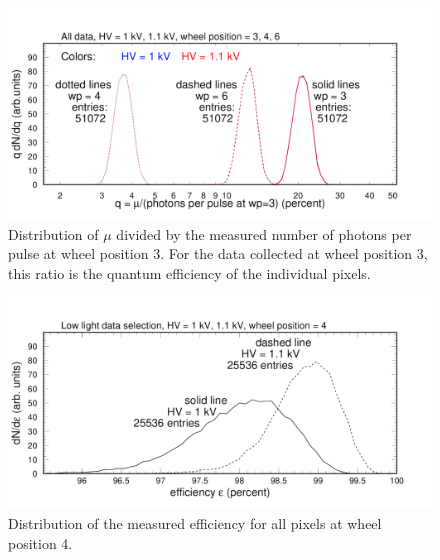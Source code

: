 \begin{figure}[h!bt]
	\centering
	\includegraphics[width=0.98\linewidth, trim=0 15 50 35, clip]{figures/pglobal_qe_all.pdf}
	\caption{Distribution of $\mu$ divided by the measured number of photons per pulse at wheel position 3. For the data collected at wheel position 3, this ratio is the quantum efficiency of the individual pixels.}
	\label{fig:pglobal_qe_all}
\end{figure}

\begin{figure}[h!bt]
	\centering
	\includegraphics[width=0.98\linewidth, trim=0 15 50 35, clip]{figures/pglobal_eff.pdf}
	\caption{Distribution of the measured efficiency for all pixels at wheel position 4.}
	\label{fig:pglobal_eff}
\end{figure}


